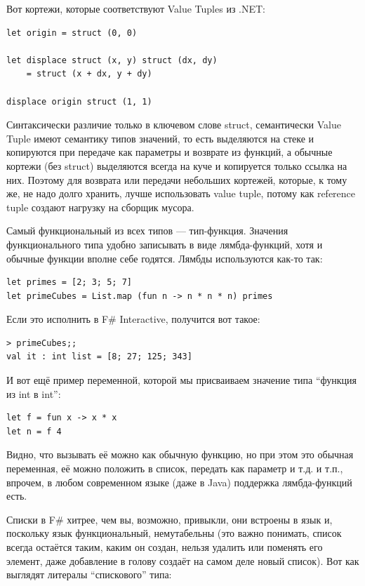 \documentclass[a5paper]{article}
\begin{document}
Вот кортежи, которые соответствуют Value Tuples из .NET:

\begin{verbatim}
let origin = struct (0, 0)

let displace struct (x, y) struct (dx, dy)
    = struct (x + dx, y + dy)

displace origin struct (1, 1)
\end{verbatim}

Синтаксически различие только в ключевом слове struct, семантически Value Tuple имеют семантику типов значений, то есть выделяются на стеке и копируются при передаче как параметры и возврате из функций, а обычные кортежи (без struct) выделяются всегда на куче и копируется только ссылка на них. Поэтому для возврата или передачи небольших кортежей, которые, к тому же, не надо долго хранить, лучше использовать value tuple, потому как reference tuple создают нагрузку на сборщик мусора.

Самый функциональный из всех типов --- тип-функция. Значения функционального типа удобно записывать в виде лямбда-функций, хотя и обычные функции вполне себе годятся. Лямбды используются как-то так:

\begin{verbatim}
let primes = [2; 3; 5; 7]
let primeCubes = List.map (fun n -> n * n * n) primes
\end{verbatim}

Если это исполнить в F\# Interactive, получится вот такое:

\begin{verbatim}
> primeCubes;;
val it : int list = [8; 27; 125; 343]
\end{verbatim}

И вот ещё пример переменной, которой мы присваиваем значение типа ``функция из int в int'':

\begin{verbatim}
let f = fun x -> x * x
let n = f 4
\end{verbatim}

Видно, что вызывать её можно как обычную функцию, но при этом это обычная переменная, её можно положить в список, передать как параметр и т.д. и т.п., впрочем, в любом современном языке (даже в Java) поддержка лямбда-функций есть.

Списки в F\# хитрее, чем вы, возможно, привыкли, они встроены в язык и, поскольку язык функциональный, немутабельны (это важно понимать, список всегда остаётся таким, каким он создан, нельзя удалить или поменять его элемент, даже добавление в голову создаёт на самом деле новый список). Вот как выглядят литералы ``спискового'' типа:
\end{document}
